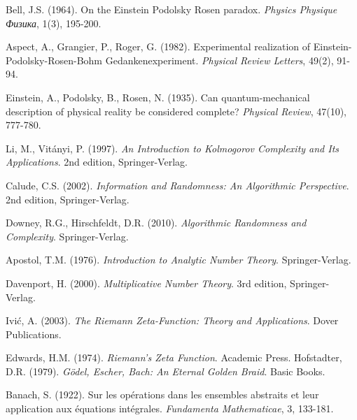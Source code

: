 \documentclass[12pt]{article}
\theoremstyle{plain}
\theoremstyle{definition}
\begin{document}
\begin{thebibliography}{99}
 Bell, J.S. (1964). On the Einstein Podolsky Rosen paradox. \emph{Physics Physique Физика}, 1(3), 195-200.

 Aspect, A., Grangier, P., Roger, G. (1982). Experimental realization of Einstein-Podolsky-Rosen-Bohm Gedankenexperiment. \emph{Physical Review Letters}, 49(2), 91-94.

 Einstein, A., Podolsky, B., Rosen, N. (1935). Can quantum-mechanical description of physical reality be considered complete? \emph{Physical Review}, 47(10), 777-780.

 Li, M., Vitányi, P. (1997). \emph{An Introduction to Kolmogorov Complexity and Its Applications}. 2nd edition, Springer-Verlag.

 Calude, C.S. (2002). \emph{Information and Randomness: An Algorithmic Perspective}. 2nd edition, Springer-Verlag.

 Downey, R.G., Hirschfeldt, D.R. (2010). \emph{Algorithmic Randomness and Complexity}. Springer-Verlag.

 Apostol, T.M. (1976). \emph{Introduction to Analytic Number Theory}. Springer-Verlag.

 Davenport, H. (2000). \emph{Multiplicative Number Theory}. 3rd edition, Springer-Verlag.

 Ivić, A. (2003). \emph{The Riemann Zeta-Function: Theory and Applications}. Dover Publications.

 Edwards, H.M. (1974). \emph{Riemann's Zeta Function}. Academic Press.
 Hofstadter, D.R. (1979). \emph{Gödel, Escher, Bach: An Eternal Golden Braid}. Basic Books.

 Banach, S. (1922). Sur les opérations dans les ensembles abstraits et leur application aux équations intégrales. \emph{Fundamenta Mathematicae}, 3, 133-181.

\end{thebibliography}
\end{document}
